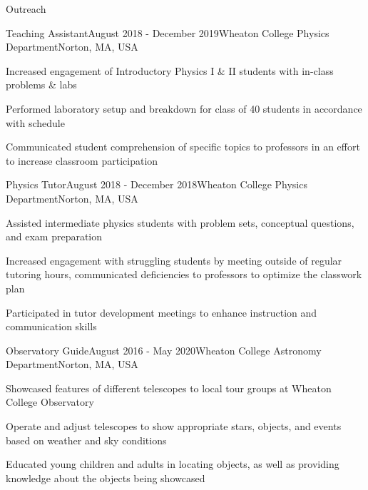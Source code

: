 \documentclass{resume} %
\begin{document}
\newpage 
\begin{rSection}{Outreach}

\begin{rSubsection}{Teaching Assistant}{August 2018 - December 2019}{Wheaton College Physics Department}{Norton, MA, USA}
\item Increased engagement of Introductory Physics I \& II students with in-class problems \& labs
\item Performed laboratory setup and breakdown for class of 40 students in accordance with schedule
\item Communicated student comprehension of specific topics to professors in an effort to increase classroom participation

\end{rSubsection}

\begin{rSubsection}{Physics Tutor}{August 2018 - December 2018}{Wheaton College Physics Department}{Norton, MA, USA}
\item Assisted intermediate physics students with problem sets, conceptual questions, and exam preparation
\item Increased engagement with struggling students by meeting outside of regular tutoring hours, communicated deficiencies to professors to optimize the classwork plan
\item Participated in tutor development meetings to enhance instruction and communication skills


\end{rSubsection}

\begin{rSubsection}{Observatory Guide}{August 2016 - May 2020}{Wheaton College Astronomy Department}{Norton, MA, USA}
\item Showcased features of different telescopes to local tour groups at Wheaton College Observatory
\item Operate and adjust telescopes to show appropriate stars, objects, and events based on weather and sky conditions
\item Educated young children and adults in locating objects, as well as providing knowledge about the objects being showcased

\end{rSubsection}

\end{rSection}
\end{document}
